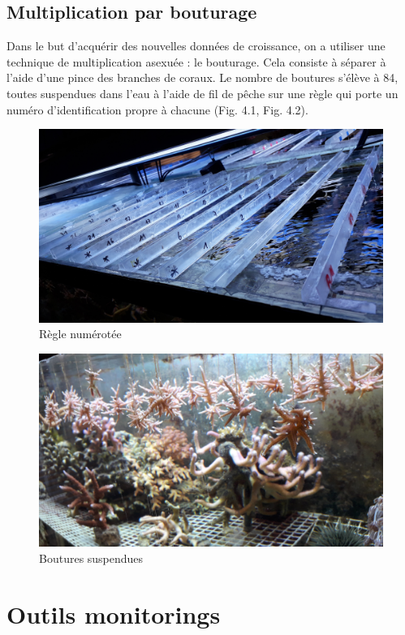 \documentclass[]{report}
\begin{document}
\subsection{Multiplication par
bouturage}\label{multiplication-par-bouturage}

Dans le but d'acquérir des nouvelles données de croissance, on a
utiliser une technique de multiplication asexuée : le bouturage. Cela
consiste à séparer à l'aide d'une pince des branches de coraux. Le
nombre de boutures s'élève à 84, toutes suspendues dans l'eau à l'aide
de fil de pêche sur une règle qui porte un numéro d'identification
propre à chacune (Fig. 4.1, Fig. 4.2).

\begin{figure}[h!]
\includegraphics[]{../image/regle.jpg}
\caption{Règle numérotée}
\end{figure}

\begin{figure}[h!]
\includegraphics[]{../image/boutures.jpg}
\caption{Boutures suspendues}
\end{figure}

\section{Outils monitorings}\label{outils-monitorings}
\end{document}
